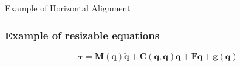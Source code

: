 \documentclass[10pt, aspectratio=169]{beamer}
\theoremstyle{remark}
\theoremstyle{definition}
\begin{document}
\begin{frame}{Example of Horizontal Alignment}
\begin{center}
\begin{minipage}[t]{.35\linewidth}
    \end{minipage}
    \end{center}
\end{frame}

\begin{frame}[allowframebreaks]
\frametitle{Example of resizable equations}

\begin{center}
\end{center}


\begin{equation}
\mathbf{\boldsymbol{\tau} = M(q) \ddot{q} + C(q,\dot{q}) \dot{q} + F \dot{q} + g (q)}
\end{equation}

\end{frame}
\end{document}
